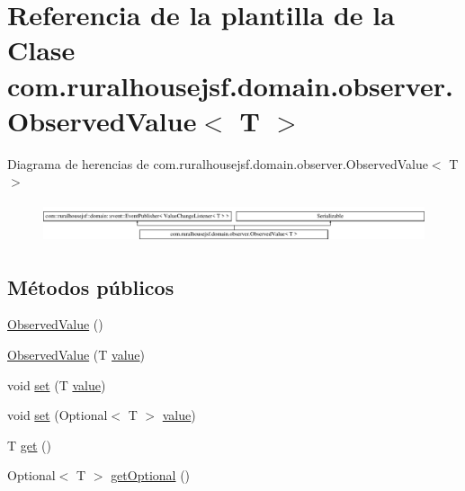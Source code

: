 \hypertarget{classcom_1_1ruralhousejsf_1_1domain_1_1observer_1_1_observed_value}{}\section{Referencia de la plantilla de la Clase com.\+ruralhousejsf.\+domain.\+observer.\+Observed\+Value$<$ T $>$}
\label{classcom_1_1ruralhousejsf_1_1domain_1_1observer_1_1_observed_value}
Diagrama de herencias de com.\+ruralhousejsf.\+domain.\+observer.\+Observed\+Value$<$ T $>$\begin{figure}[H]
\begin{center}
\leavevmode
\includegraphics[height=1.181435cm]{df/d1d/classcom_1_1ruralhousejsf_1_1domain_1_1observer_1_1_observed_value}
\end{center}
\end{figure}
\subsection*{Métodos públicos}
\begin{DoxyCompactItemize}
\item 
\mbox{\hyperlink{classcom_1_1ruralhousejsf_1_1domain_1_1observer_1_1_observed_value_a3e9d0c3cf901dfdc6c5d919021d9b8ed}{Observed\+Value}} ()
\item 
\mbox{\hyperlink{classcom_1_1ruralhousejsf_1_1domain_1_1observer_1_1_observed_value_a428dfb79e0d2f9946e9361d8674b070b}{Observed\+Value}} (T \mbox{\hyperlink{classcom_1_1ruralhousejsf_1_1domain_1_1observer_1_1_observed_value_a7f337dfd21158b7642243b5fd1fcb877}{value}})
\item 
void \mbox{\hyperlink{classcom_1_1ruralhousejsf_1_1domain_1_1observer_1_1_observed_value_a7397923ac9ae07a242775665542dee80}{set}} (T \mbox{\hyperlink{classcom_1_1ruralhousejsf_1_1domain_1_1observer_1_1_observed_value_a7f337dfd21158b7642243b5fd1fcb877}{value}})
\item 
void \mbox{\hyperlink{classcom_1_1ruralhousejsf_1_1domain_1_1observer_1_1_observed_value_aaa277755e533e7e85e11640fc98866af}{set}} (Optional$<$ T $>$ \mbox{\hyperlink{classcom_1_1ruralhousejsf_1_1domain_1_1observer_1_1_observed_value_a7f337dfd21158b7642243b5fd1fcb877}{value}})
\item 
T \mbox{\hyperlink{classcom_1_1ruralhousejsf_1_1domain_1_1observer_1_1_observed_value_a6e489c75f998a9668e284a6df19d1184}{get}} ()
\item 
Optional$<$ T $>$ \mbox{\hyperlink{classcom_1_1ruralhousejsf_1_1domain_1_1observer_1_1_observed_value_a907b308692e368ef1021835f556ddc82}{get\+Optional}} ()
\end{DoxyCompactItemize}
